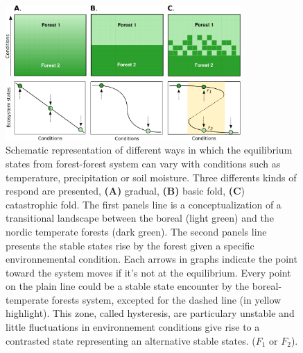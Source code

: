 \begin{figure}[t]
	\begin{center}
	\includegraphics[width=0.8\textwidth]{fig/states.pdf}
	\end{center}
	\caption{Schematic representation of different ways in which the equilibrium
	states from forest-forest system can vary with conditions such as temperature, precipitation
	or soil moisture. Three differents kinds of respond are presented,
	\textbf{(A)} gradual, \textbf{(B)} basic fold, \textbf{(C}) catastrophic fold.
	The first panels line is a conceptualization of a transitional landscape
	between the boreal (light green) and the nordic temperate forests (dark
	green). The second panels line presents the stable states rise by the forest
	given a specific environnemental condition. Each arrows in graphs indicate the
	point toward the system moves if it's not at the equilibrium. Every point on
	the plain line could be a stable state encounter by the boreal-temperate
	forests system, excepted for the dashed line (in yellow highlight). This zone,
	called hysteresis, are particulary unstable and little fluctuations in
	environnement conditions give rise to a contrasted state representing an
	alternative stable states. ($F_1$ or $F_2$).}
	\label{fig1}
\end{figure}


